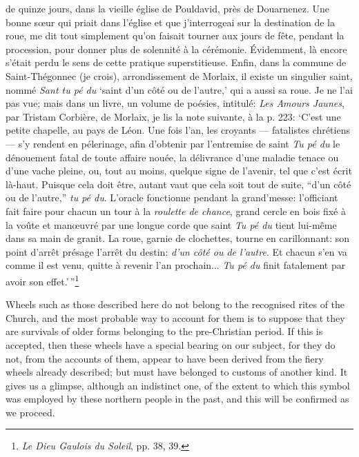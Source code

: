 \documentclass[a4paper, 11pt, oneside, polutonikogreek, english]{article}
\begin{document}
de quinze jours, dans la vieille église de Pouldavid, près de Douarnenez. Une bonne sœur qui priait dans l'église et que j'interrogeai sur la destination de la roue, me dit tout simplement qu'on faisait tourner aux jours de fête, pendant la procession, pour donner plus de solennité à la cérémonie. Évidemment, là encore s'était perdu le sens de cette pratique superstitieuse. Enfin, dans la commune de Saint-Thégonnec (je crois), arrondissement de Morlaix, il existe un singulier saint, nommé \emph{Sant tu pé du} `saint d'un côté ou de l'autre,' qui a aussi sa roue. Je ne l'ai pas vue; mais dans un livre, un volume de poésies, intitulé: \emph{Les Amours Jaunes}, par Tristam Corbière, de Morlaix, je lis la note suivante, à la p. 223: `C'est une petite chapelle, au pays de Léon. Une fois l'an, les croyants --- fatalistes chrétiens --- s'y rendent en pélerinage, afin d'obtenir par l'entremise de saint \emph{Tu pé du} le dénouement fatal de toute affaire nouée, la délivrance d'une maladie tenace ou d'une vache pleine, ou, tout au moins, quelque signe de l'avenir, tel que c'est écrit là-haut. Puisque cela doit être, autant vaut que cela soit tout de suite, ``d'un côté ou de l'autre,'' \emph{tu pé du}. L'oracle fonctionne pendant la grand'messe: l'officiant fait faire pour chacun un tour à la \emph{roulette de chance}, grand cercle en bois fixé à la voûte et manœuvré par une longue corde que saint \emph{Tu pé du} tient lui-même dans sa main de granit. La roue, garnie de clochettes, tourne en carillonnant: son point d'arrêt présage l'arrêt du destin: \emph{d'un côté ou de l'autre}. Et chacun s'en va comme il est venu, quitte à revenir l'an prochain... \emph{Tu pé du} finit fatalement par avoir son effet.'\,''\footnote{\emph{Le Dieu Gaulois du Soleil}, pp. 38, 39.}

Wheels such as those described here do not belong to the recognised rites of the Church, and the most probable way to account for them is to suppose that they are survivals of older forms belonging to the pre-Christian period. If this is accepted, then these wheels have a special bearing on our subject, for they do not, from the accounts of them, appear to have been derived from the fiery wheels already described; but must have belonged to customs of another kind. It gives us a glimpse, although an indistinct one, of the extent to which this symbol was employed by these northern people in the past, and this will be confirmed as we proceed.
\end{document}
